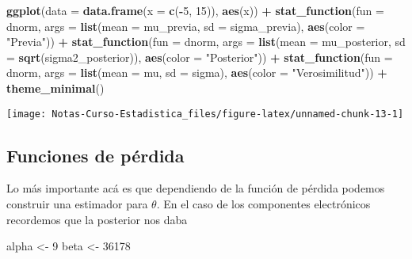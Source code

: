 \documentclass[
  12pt,
]{book}
\newenvironment{Shaded}{\begin{snugshade}}{\end{snugshade}}
\newcommand{\DataTypeTok}[1]{\textcolor[rgb]{0.13,0.29,0.53}{#1}}
\newcommand{\DecValTok}[1]{\textcolor[rgb]{0.00,0.00,0.81}{#1}}
\newcommand{\KeywordTok}[1]{\textcolor[rgb]{0.13,0.29,0.53}{\textbf{#1}}}
\newcommand{\NormalTok}[1]{#1}
\newcommand{\OperatorTok}[1]{\textcolor[rgb]{0.81,0.36,0.00}{\textbf{#1}}}
\newcommand{\StringTok}[1]{\textcolor[rgb]{0.31,0.60,0.02}{#1}}
\begin{document}
\begin{Shaded}
\begin{Highlighting}[]
\KeywordTok{ggplot}\NormalTok{(}\DataTypeTok{data =} \KeywordTok{data.frame}\NormalTok{(}\DataTypeTok{x =} \KeywordTok{c}\NormalTok{(}\OperatorTok{{-}}\DecValTok{5}\NormalTok{, }\DecValTok{15}\NormalTok{)), }\KeywordTok{aes}\NormalTok{(x)) }\OperatorTok{+}\StringTok{ }
\StringTok{    }\KeywordTok{stat\_function}\NormalTok{(}\DataTypeTok{fun =}\NormalTok{ dnorm, }\DataTypeTok{args =} \KeywordTok{list}\NormalTok{(}\DataTypeTok{mean =}\NormalTok{ mu\_previa, }
        \DataTypeTok{sd =}\NormalTok{ sigma\_previa), }\KeywordTok{aes}\NormalTok{(}\DataTypeTok{color =} \StringTok{"Previa"}\NormalTok{)) }\OperatorTok{+}\StringTok{ }
\StringTok{    }\KeywordTok{stat\_function}\NormalTok{(}\DataTypeTok{fun =}\NormalTok{ dnorm, }\DataTypeTok{args =} \KeywordTok{list}\NormalTok{(}\DataTypeTok{mean =}\NormalTok{ mu\_posterior, }
        \DataTypeTok{sd =} \KeywordTok{sqrt}\NormalTok{(sigma2\_posterior)), }\KeywordTok{aes}\NormalTok{(}\DataTypeTok{color =} \StringTok{"Posterior"}\NormalTok{)) }\OperatorTok{+}\StringTok{ }
\StringTok{    }\KeywordTok{stat\_function}\NormalTok{(}\DataTypeTok{fun =}\NormalTok{ dnorm, }\DataTypeTok{args =} \KeywordTok{list}\NormalTok{(}\DataTypeTok{mean =}\NormalTok{ mu, }
        \DataTypeTok{sd =}\NormalTok{ sigma), }\KeywordTok{aes}\NormalTok{(}\DataTypeTok{color =} \StringTok{"Verosimilitud"}\NormalTok{)) }\OperatorTok{+}\StringTok{ }
\StringTok{    }\KeywordTok{theme\_minimal}\NormalTok{()}
\end{Highlighting}
\end{Shaded}

\begin{center}\texttt{[image: Notas-Curso-Estadistica\_files/figure-latex/unnamed-chunk-13-1]} \end{center}

\hypertarget{funciones-de-puxe9rdida-1}{%
\subsection{Funciones de pérdida}\label{funciones-de-puxe9rdida-1}}

Lo más importante acá es que dependiendo de la función de pérdida podemos construir una estimador para \(\theta\). En el caso de los componentes electrónicos recordemos que la posterior nos daba

\begin{Shaded}
\begin{Highlighting}[]
\NormalTok{alpha \textless{}{-}}\StringTok{ }\DecValTok{9}
\NormalTok{beta \textless{}{-}}\StringTok{ }\DecValTok{36178}
\end{Highlighting}
\end{Shaded}
\end{document}
